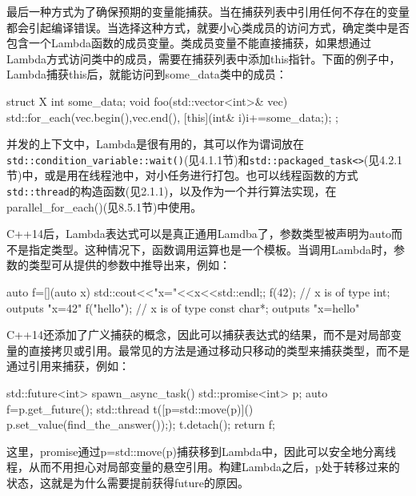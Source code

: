 最后一种方式为了确保预期的变量能捕获。当在捕获列表中引用任何不存在的变量都会引起编译错误。当选择这种方式，就要小心类成员的访问方式，确定类中是否包含一个Lambda函数的成员变量。类成员变量不能直接捕获，如果想通过Lambda方式访问类中的成员，需要在捕获列表中添加this指针。下面的例子中，Lambda捕获this后，就能访问到some\_data类中的成员：

\begin{cpp}
struct X
{
  int some_data;
  void foo(std::vector<int>& vec)
  {
    std::for_each(vec.begin(),vec.end(),
         [this](int& i){i+=some_data;});
  }
};
\end{cpp}

并发的上下文中，Lambda是很有用的，其可以作为谓词放在\texttt{std::condition\_variable::wait()}(见4.1.1节)和\texttt{std::packaged\_task<>}(见4.2.1节)中，或是用在线程池中，对小任务进行打包。也可以线程函数的方式\texttt{std::thread}的构造函数(见2.1.1)，以及作为一个并行算法实现，在parallel\_for\_each()(见8.5.1节)中使用。

C++14后，Lambda表达式可以是真正通用Lamdba了，参数类型被声明为auto而不是指定类型。这种情况下，函数调用运算也是一个模板。当调用Lambda时，参数的类型可从提供的参数中推导出来，例如：

\begin{cpp}
auto f=[](auto x){ std::cout<<"x="<<x<<std::endl;};
f(42); // x is of type int; outputs "x=42"
f("hello"); // x is of type const char*; outputs "x=hello"
\end{cpp}

C++14还添加了广义捕获的概念，因此可以捕获表达式的结果，而不是对局部变量的直接拷贝或引用。最常见的方法是通过移动只移动的类型来捕获类型，而不是通过引用来捕获，例如：

\begin{cpp}
std::future<int> spawn_async_task(){
  std::promise<int> p;
  auto f=p.get_future();
  std::thread t([p=std::move(p)](){ p.set_value(find_the_answer());});
  t.detach();
  return f;
}
\end{cpp}

这里，promise通过p=std::move(p)捕获移到Lambda中，因此可以安全地分离线程，从而不用担心对局部变量的悬空引用。构建Lambda之后，p处于转移过来的状态，这就是为什么需要提前获得future的原因。